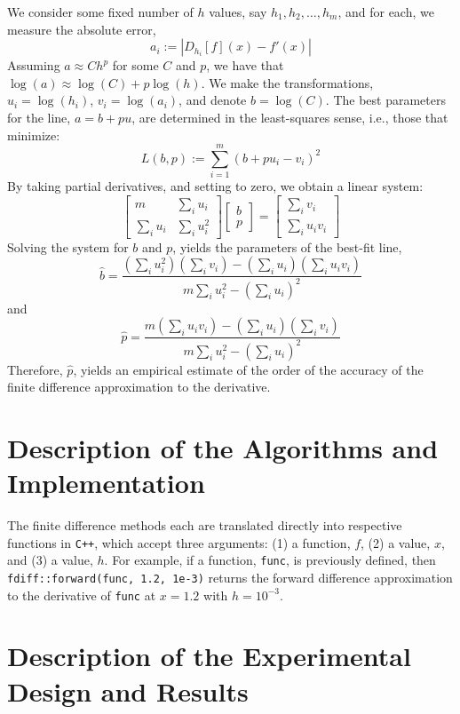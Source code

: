 \documentclass[11pt]{article}
\begin{document}
We consider some fixed number of $h$ values, say $h_1, h_2, \ldots, h_m$, and for each, we measure the absolute error,
$$
    a_i := |D_{h_i}[f](x)-f'(x)|
$$
Assuming $a \approx Ch^p$ for some $C$ and $p$, we have that $\log(a) \approx \log(C) + p\log(h)$. We make the transformations, $u_i = \log(h_i)$, $v_i = \log(a_i)$, and denote $b=\log(C)$. The best parameters for the line, $a = b + pu$, are determined in the least-squares sense, i.e., those that minimize:
$$
    L(b,p) := \sum_{i=1}^m \left(b+pu_i - v_i\right)^2
$$
By taking partial derivatives, and setting to zero, we obtain a linear system:
$$
    \begin{bmatrix}
        m          & \sum_i u_i \\
        \sum_i u_i & \sum_i u_i^2
    \end{bmatrix}
    \begin{bmatrix} b \\ p \end{bmatrix}
    =
    \begin{bmatrix} \sum_i v_i \\ \sum_i u_iv_i \end{bmatrix}
$$
Solving the system for $b$ and $p$, yields the parameters of the best-fit line,
$$
    \hat{b} = \frac{\left(\sum_i u_i^2\right) \left(\sum_i v_i\right) - \left(\sum_i u_i\right)\left(\sum_i u_iv_i\right)}{m\sum_i u_i^2 - \left(\sum_i u_i \right)^2}
$$
and
$$
    \hat{p} = \frac{m\left(\sum_i u_iv_i\right) - \left(\sum_i u_i\right)\left(\sum_i v_i\right)}{m\sum_i u_i^2 - \left(\sum_i u_i \right)^2}
$$
Therefore, $\hat{p}$, yields an empirical estimate of the order of the accuracy of the finite difference approximation to the derivative.

\section{Description of the Algorithms and Implementation}

The finite difference methods each are translated directly into respective functions in \texttt{C++}, which accept three arguments: (1) a function, $f$, (2) a value, $x$, and (3) a value, $h$. For example, if a function, \texttt{func}, is previously defined, then \texttt{fdiff::forward(func, 1.2, 1e-3)} returns the forward difference approximation to the derivative of \texttt{func} at $x=1.2$ with $h=10^{-3}$.

\section{Description of the Experimental Design and Results}
\end{document}
